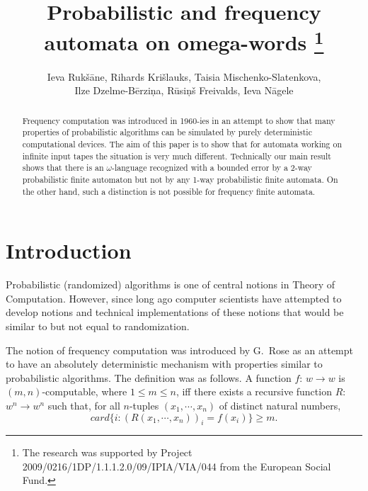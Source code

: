 \documentclass{llncs}
\begin{document}
\title{Probabilistic and frequency automata on omega-words
\thanks{%
The research was supported by  Project 2009/0216/1DP/1.1.1.2.0/09/IPIA/VIA/044
from the 
European Social Fund.
} 
}

\author{
Ieva Ruk\v s\= ane,
Rihards Kri\v slauks,
Taisia Mischenko-Slatenkova,\\
Ilze Dzelme-B\= erzi\c na,
R\= usi\c n\v s Freivalds,
Ieva N\= agele}

\maketitle

\begin{abstract}  Frequency computation was introduced in 1960-ies in an attempt to show that many properties of probabilistic algorithms can be simulated by purely deterministic computational devices. The aim of this paper is to show that for automata working on infinite input tapes the situation is very much different. Technically our main result shows that there is an $\omega$-language recognized with a bounded error by a 2-way probabilistic finite automaton but not by any 1-way probabilistic finite automata. On the other hand, such a distinction is not possible for frequency finite automata.

\end{abstract} 

\section{Introduction}


Probabilistic (randomized) algorithms is one of central notions in Theory of Computation. However, since long ago computer scientists have attempted to develop notions and technical implementations of these notions that would be similar to but not equal to randomization.
 

The notion of frequency computation was introduced by G.~Rose \cite{R60} as an attempt to have an absolutely deterministic mechanism with properties similar to probabilistic algorithms. The definition was as follows. A function $f$: $w \to w$ is $(m,n)$-computable, where $1 \leq m \leq n$, iff there exists a recursive function $R$: $w^n \to w^n$ such that, for all $n$-tuples $(x_1, \cdots , x_n)$ of distinct natural numbers,
$$
card\{i: (R(x_1,\cdots , x_n))_i = f(x_i)\} \geq m.
$$
\end{document}
